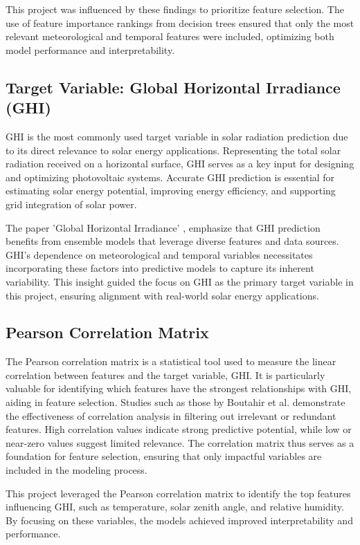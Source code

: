 \documentclass[10pt,twocolumn]{article}
\begin{document}
\begin{itemize}
This project was influenced by these findings to prioritize feature selection. The use of feature importance rankings from decision trees ensured that only the most relevant meteorological and temporal features were included, optimizing both model performance and interpretability.

\subsection{Target Variable: Global Horizontal Irradiance (GHI)}
GHI is the most commonly used target variable in solar radiation prediction due to its direct relevance to solar energy applications. Representing the total solar radiation received on a horizontal surface, GHI serves as a key input for designing and optimizing photovoltaic systems. Accurate GHI prediction is essential for estimating solar energy potential, improving energy efficiency, and supporting grid integration of solar power.

The paper 'Global Horizontal Irradiance' \cite{8}, emphasize that GHI prediction benefits from ensemble models that leverage diverse features and data sources. GHI's dependence on meteorological and temporal variables necessitates incorporating these factors into predictive models to capture its inherent variability. This insight guided the focus on GHI as the primary target variable in this project, ensuring alignment with real-world solar energy applications.

\subsection{Pearson Correlation Matrix}
The Pearson correlation matrix is a statistical tool used to measure the linear correlation between features and the target variable, GHI. It is particularly valuable for identifying which features have the strongest relationships with GHI, aiding in feature selection. Studies such as those by Boutahir et al. \cite{5} demonstrate the effectiveness of correlation analysis in filtering out irrelevant or redundant features. High correlation values indicate strong predictive potential, while low or near-zero values suggest limited relevance. The correlation matrix thus serves as a foundation for feature selection, ensuring that only impactful variables are included in the modeling process.

This project leveraged the Pearson correlation matrix to identify the top features influencing GHI, such as temperature, solar zenith angle, and relative humidity. By focusing on these variables, the models achieved improved interpretability and performance.


\end{itemize}
\end{document}
